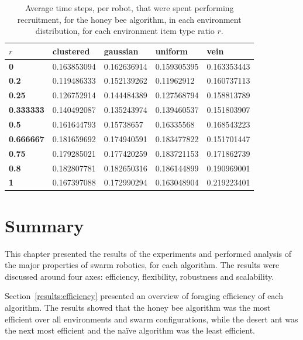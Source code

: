 \begin{table}[]
\centering
\caption{Average time steps, per robot, that were spent performing recruitment, for the honey bee algorithm, in each environment distribution, for each environment item type ratio $r$.}
\label{averagetimerecruitment}
\begin{tabular}{@{}lllll@{}}
\toprule
$r$            & \textbf{clustered} & \textbf{gaussian} & \textbf{uniform} & \textbf{vein} \\ \midrule
\textbf{0}        & 0.163853094        & 0.162636914       & 0.159305395      & 0.163353443   \\
\textbf{0.2}      & 0.119486333        & 0.152139262       & 0.11962912       & 0.160737113   \\
\textbf{0.25}     & 0.126752914        & 0.144484389       & 0.127568794      & 0.158813789   \\
\textbf{0.333333} & 0.140492087        & 0.135243974       & 0.139460537      & 0.151803907   \\
\textbf{0.5}      & 0.161644793        & 0.15738657        & 0.16335568       & 0.168543223   \\
\textbf{0.666667} & 0.181659692        & 0.174940591       & 0.183477822      & 0.151701447   \\
\textbf{0.75}     & 0.179285021        & 0.177420259       & 0.183721153      & 0.171862739   \\
\textbf{0.8}      & 0.182807781        & 0.182650316       & 0.186144899      & 0.190969001   \\
\textbf{1}        & 0.167397088        & 0.172990294       & 0.163048904      & 0.219223401   \\ \bottomrule
\end{tabular}
\end{table}

\section{Summary}
\label{results:summary}

This chapter presented the results of the experiments and performed analysis of the major properties of swarm robotics, for each algorithm. The results were discussed around four axes: efficiency, flexibility, robustness and scalability. 

Section~\ref{results:efficiency} presented an overview of foraging efficiency of each algorithm. The results showed that the honey bee algorithm was the most efficient over all environments and swarm configurations, while the desert ant was the next most efficient and the na\"ive algorithm was the least efficient.

